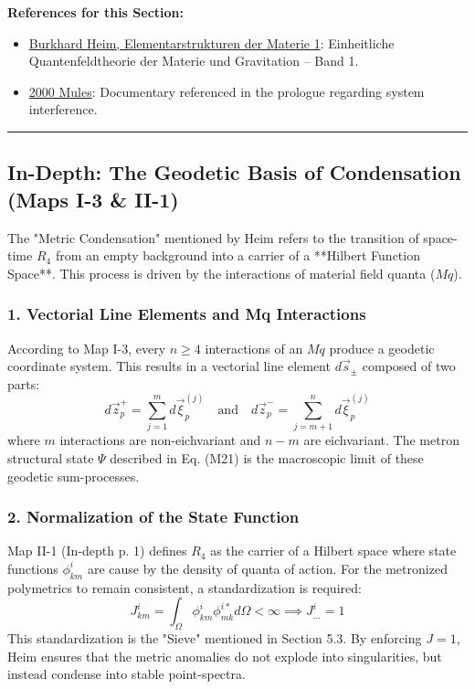 \documentclass[11pt,a4paper,oneside]{article}
\newenvironment{sectionrefs}
  {\par\vspace{1em}\noindent\textbf{\textsf{References for this Section:}}\begin{itemize}[leftmargin=*, label={\scriptsize$\blacksquare$}, itemsep=2pt]}
  {\end{itemize}}
\newcommand{\hr}{\par\vspace{2em}\noindent\rule{\linewidth}{0.4pt}\par\vspace{2em}}
\begin{document}
\begin{sectionrefs}
    \item \href{https://www.engon.de/protosimplex/index_e.htm}{Burkhard Heim, Elementarstrukturen der Materie 1}: Einheitliche Quantenfeldtheorie der Materie und Gravitation – Band 1.
    \item \href{https://2000mules.com/}{2000 Mules}: Documentary referenced in the prologue regarding system interference.
\end{sectionrefs}

\hr

\subsection*{In-Depth: The Geodetic Basis of Condensation (Maps I-3 \& II-1)}

The "Metric Condensation" mentioned by Heim refers to the transition of space-time $R_4$ from an empty background into a carrier of a **Hilbert Function Space**. This process is driven by the interactions of material field quanta ($Mq$).

\subsubsection*{1. Vectorial Line Elements and Mq Interactions}
According to Map I-3, every $n \ge 4$ interactions of an $Mq$ produce a geodetic coordinate system. This results in a vectorial line element $d\vec{s}_{\pm}$ composed of two parts:
\begin{equation}
    d\vec{z}_p^+ = \sum_{j=1}^m d\vec{\xi}_p^{(j)} \quad \text{and} \quad d\vec{z}_p^- = \sum_{j=m+1}^n d\vec{\xi}_p^{(j)}
\end{equation}
where $m$ interactions are non-eichvariant and $n-m$ are eichvariant. The metron structural state $\Psi$ described in Eq. (M21) is the macroscopic limit of these geodetic sum-processes.

\subsubsection*{2. Normalization of the State Function}
Map II-1 (In-depth p. 1) defines $R_4$ as the carrier of a Hilbert space where state functions $\phi_{km}^i$ are cause by the density of quanta of action. For the metronized polymetrics to remain consistent, a standardization is required:
\begin{equation}
    J_{km}^i = \int_{\Omega} \phi_{km}^i \phi_{mk}^{i*} d\Omega < \infty \implies J_{\dots}^i = 1
\end{equation}
This standardization is the "Sieve" mentioned in Section 5.3. By enforcing $J=1$, Heim ensures that the metric anomalies do not explode into singularities, but instead condense into stable point-spectra.
\end{document}
